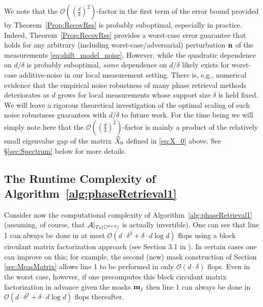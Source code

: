 We note that the  $\mathcal{O}\left( \left(\frac{d}{\delta} \right)^2 \right)$-factor in the first term of the error bound provided by Theorem~\ref{Prop:RecovRes} is probably suboptimal, especially in practice.  Indeed, Theorem~\ref{Prop:RecovRes} provides a worst-case error guarantee that holds for any arbitrary (including worst-case/adversarial) perturbation $\mathbf n$ of the measurements \eqref{eq:shift_model_noise}.  %
However, while the quadratic dependence on $d/\delta$ is probably suboptimal, \textit{some} dependence on $d/\delta$ likely exists for worst-case additive-noise in our local measurement setting.  There is, e.g., numerical evidence that the empirical noise robustness of many phase retrieval methods deteriorates as $d$ grows for local measurements whose support size $\delta$ is held fixed.  We will leave a rigorous theoretical investigation of the optimal scaling of such noise robustness guarantees with $d/\delta$ to future work.  For the time being we will simply note here that the $\mathcal{O}\left( \left(\frac{d}{\delta} \right)^2 \right)$-factor %
is mainly a product of the relatively small eigenvalue gap of the matrix $\widetilde{X}_0$ defined in \eqref{eq:X_0} above.  See \S\ref{sec:Spectrum} below for more details.

\subsection{The Runtime Complexity of Algorithm~\ref{alg:phaseRetrieval1}}
\label{sec:RuntimeAlg1}

Consider now the computational complexity of Algorithm~\ref{alg:phaseRetrieval1} (assuming, of course, that $\mathcal{A}|_{T_\delta(\mathbb{C}^{d\times d})}$ is actually invertible).  One can see that line 1 can  always be done in at most $\mathcal{O}(d \cdot \delta^3 + \delta \cdot d \log d)$ flops using a block circulant matrix factorization approach (see Section 3.1 in \cite{IVW2015_FastPhase}). In certain cases one can improve on this; for example, the second (new) mask construction of Section \ref{sec:MeasMatrix} allows line 1 to be performed in only $\mathcal{O}(d\cdot\delta)$ flops.  Even in the worst case, however, if one precomputes this block circulant matrix factorization in advance given the masks $\mathbf m_j$ then line 1 can always be done in $\mathcal{O}(d \cdot \delta^2 + \delta \cdot d \log d)$ flops thereafter.  

